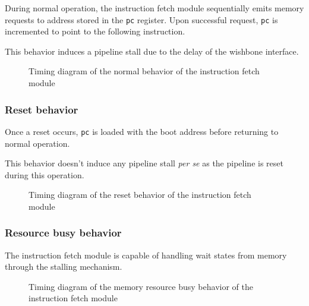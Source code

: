       \begin{content}
          During normal operation, the instruction fetch module sequentially emits memory requests to address stored in the \texttt{pc} register. Upon successful request, \texttt{pc} is incremented to point to the following instruction.

          This behavior induces a pipeline stall due to the delay of the wishbone interface.
        \end{content}

      \begin{figure}[H]
          \centering
          
          \caption{Timing diagram of the normal behavior of the instruction fetch module}
          \label{fig:ifm-behavior-normal}
        \end{figure}

    \subsubsection{Reset behavior}

      \begin{content}
          Once a reset occurs, \texttt{pc} is loaded with the boot address before returning to normal operation.

          This behavior doesn't induce any pipeline stall \textit{per se} as the pipeline is reset during this operation.
        \end{content}

      \begin{figure}[H]
          \centering
          
          \caption{Timing diagram of the reset behavior of the instruction fetch module}
          \label{fig:ifm-behavior-reset}
        \end{figure}

    \subsubsection{Resource busy behavior}

      \begin{content}
          The instruction fetch module is capable of handling wait states from memory through the stalling mechanism.
        \end{content}

      \begin{figure}[H]
          \centering
          
          \caption{Timing diagram of the memory resource busy behavior of the instruction fetch module}
          \label{fig:ifm-behavior-wait}
        \end{figure}

